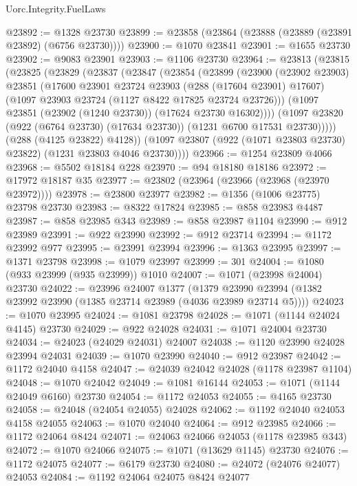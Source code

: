 \begin{lexlean}{Uorc.Integrity.FuelLaws}
\begin{coremodule}
@23892 := @1328 @23730
@23899 := @23858 (@23864 (@23888 (@23889 (@23891 @23892) (@6756 @23730))))
@23900 := @1070 @23841
@23901 := @1655 @23730
@23902 := @9083 @23901
@23903 := @1106 @23730
@23964 := @23813
    (@23815
      (@23825
        (@23829
          (@23837
            (@23847
              (@23854
                (@23899
                  (@23900
                    (@23902 @23903)
                    @23851
                    (@17600
                      @23901
                      @23724
                      @23903
                      (@288 (@17604 @23901) @17607)
                      (@1097 @23903 @23724 (@1127 @8422 @17825 @23724 @23726)))
                    (@1097 @23851 (@23902 (@1240 @23730)) (@17624 @23730 @16302))))
                (@1097 @23820 (@922 (@6764 @23730) (@17634 @23730)) (@1231 @6700 @17531 @23730)))))
          (@288 (@4125 @23822) @4128))
        (@1097 @23807 (@922 (@1071 @23803 @23730) @23822) (@1231 @23803 @4046 @23730))))
@23966 := @1254 @23809 @4066
@23968 := @5502 @18184 @228
@23970 := @94 @18180 @18186
@23972 := @17972 @18187 @35
@23977 := @23802 (@23964 (@23966 (@23968 (@23970 @23972))))
@23978 := @23800 @23977
@23982 := @1356 (@1006 @23775) @23798 @23730
@23983 := @8322 @17824
@23985 := @858 @23983 @4487
@23987 := @858 @23985 @343
@23989 := @858 @23987 @1104
@23990 := @912 @23989
@23991 := @922 @23990
@23992 := @912 @23714
@23994 := @1172 @23992 @977
@23995 := @23991 @23994
@23996 := @1363 @23995
@23997 := @1371 @23798
@23998 := @1079 @23997
@23999 := 301
@24004 := @1080 (@933 @23999 (@935 @23999)) @1010
@24007 := @1071 (@23998 @24004) @23730
@24022 := @23996
    @24007
    @1377
    (@1379 @23990 @23994 (@1382 @23992 @23990 (@1385 @23714 @23989 (@4036 @23989 @23714 @5))))
@24023 := @1070 @23995
@24024 := @1081 @23798
@24028 := @1071 (@1144 @24024 @4145) @23730
@24029 := @922 @24028
@24031 := @1071 @24004 @23730
@24034 := @24023 (@24029 @24031) @24007
@24038 := @1120 @23990 @24028 @23994 @24031
@24039 := @1070 @23990
@24040 := @912 @23987
@24042 := @1172 @24040 @4158
@24047 := @24039 @24042 @24028 (@1178 @23987 @1104)
@24048 := @1070 @24042
@24049 := @1081 @16144
@24053 := @1071 (@1144 @24049 @6160) @23730
@24054 := @1172 @24053
@24055 := @4165 @23730
@24058 := @24048 (@24054 @24055) @24028
@24062 := @1192 @24040 @24053 @4158 @24055
@24063 := @1070 @24040
@24064 := @912 @23985
@24066 := @1172 @24064 @8424
@24071 := @24063 @24066 @24053 (@1178 @23985 @343)
@24072 := @1070 @24066
@24075 := @1071 (@13629 @1145) @23730
@24076 := @1172 @24075
@24077 := @6179 @23730
@24080 := @24072 (@24076 @24077) @24053
@24084 := @1192 @24064 @24075 @8424 @24077

\end{coremodule}
\end{lexlean}
